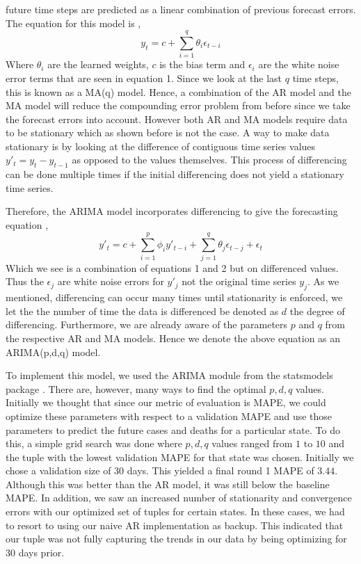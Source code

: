 \documentclass[sigconf,nonacm]{acmart}
\begin{document}
future time steps are predicted as a linear combination of previous forecast errors. The equation for this model is \cite{forecasting},
\begin{equation}
y_t = c + \sum_{i=1}^{q} \theta_i \epsilon_{t-i}
\end{equation} 
Where $\theta_i$ are the learned weights, $c$ is the bias term and $\epsilon_i$ are the white noise error terms that are 
seen in equation 1. Since we look at the last $q$ time steps, this is known as a MA(q) model.
Hence, a combination of the AR model and the MA model will reduce the compounding error problem from before since we
take the forecast errors into account. However both AR and MA models require data to be stationary which as shown before is not
the case. A way to make data stationary is by looking at the difference of contiguous time series values $y'_t = y_t - y_{t-1}$
as opposed to the values themselves. This process of differencing can be done multiple times if the initial differencing does
not yield a stationary time series.

Therefore, the ARIMA model incorporates differencing to give the forecasting equation \cite{forecasting},
\begin{equation}
  y'_t = c + \sum_{i = 1}^{p} \phi_i y'_{t-i} + \sum_{j=1}^{q} \theta_j \epsilon_{t-j} + \epsilon_t
\end{equation}
Which we see is a combination of equations 1 and 2 but on differenced values. Thus the $\epsilon_j$ are white noise errors for
$y'_j$ not the original time series $y_j$. As we mentioned, differencing can occur many times until stationarity is enforced,
we let the the number of time the data is differenced be denoted as $d$ the degree of differencing. Furthermore, we are
already aware of the parameters $p$ and $q$ from the respective AR and MA models. Hence we denote the above equation as an
ARIMA(p,d,q) model. 

To implement this model, we used the ARIMA module from the statsmodels package \cite{statsmodels}. There are, however, many
ways to find the optimal $p,d,q$ values. Initially we thought that since our metric of evaluation is MAPE, we could optimize
these parameters with respect to a validation MAPE and use those parameters to predict the future cases and deaths for a 
particular state. To do this, a simple grid search was done where $p,d,q$ values ranged from $1$ to $10$ and the tuple with the
lowest validation MAPE for that state was chosen. Initially we chose a validation size of 30 days. This yielded a final round 1 MAPE of $3.44$.
Although this was better than the AR model, it was still below the baseline MAPE. In addition, we saw an increased number 
of stationarity and convergence errors with our optimized set of tuples for certain states. In these cases, we had to resort to
using our naive AR implementation as backup. This indicated that our tuple was not fully capturing the trends in our data
by being optimizing for 30 days prior. 
\end{document}
